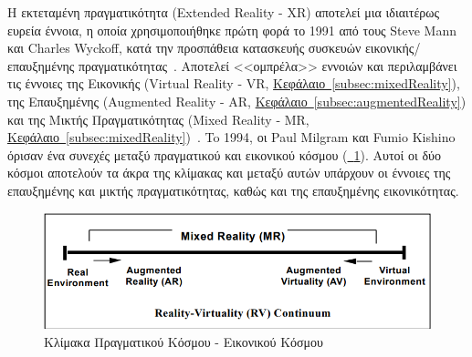 
 Η εκτεταμένη πραγματικότητα (Extended Reality - XR) αποτελεί μια ιδιαιτέρως ευρεία έννοια, η οποία χρησιμοποιήθηκε πρώτη φορά το 1991 από τους Steve Mann και Charles Wyckoff, κατά την προσπάθεια κατασκευής συσκευών εικονικής/επαυξημένης πραγματικότητας~\cite{mann_2023_fundamentals,mann_1991_extended}. Αποτελεί <<ομπρέλα>> εννοιών και περιλαμβάνει τις έννοιες της Εικονικής (Virtual Reality - VR, \hyperref[subsec:mixedReality]{Κεφάλαιο~\ref*{subsec:mixedReality}}), της Επαυξημένης (Augmented Reality - AR, \hyperref[subsec:augmentedReality]{Κεφάλαιο~\ref*{subsec:augmentedReality}}) και της Μικτής Πραγματικότητας (Mixed Reality - MR, \hyperref[subsec:mixedReality]{Κεφάλαιο~\ref*{subsec:mixedReality}})~\cite{milgram_1994_augmented}. To 1994, οι Paul Milgram και Fumio Kishino όρισαν ένα συνεχές μεταξύ πραγματικού και εικονικού κόσμου (\hyperref[fig:rv_continuum]{\schema~\ref*{fig:rv_continuum}}). Αυτοί οι δύο κόσμοι αποτελούν τα άκρα της κλίμακας και μεταξύ αυτών υπάρχουν οι έννοιες της επαυξημένης και μικτής πραγματικότητας, καθώς και της επαυξημένης εικονικότητας.
\begin{figure}[!h]
    \centering
    \includegraphics[width=120mm]{images/rv_continuum.png}
    \caption[Κλίμακα Πραγματικού Κόσμου - Εικονικού Κόσμου]{Κλίμακα Πραγματικού Κόσμου - Εικονικού Κόσμου~\cite{milgram_1994_augmented}}\label{fig:rv_continuum}
\end{figure}

